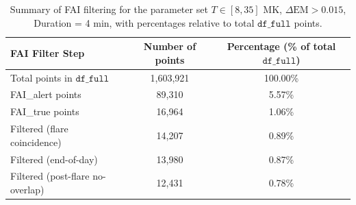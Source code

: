 \begin{table}[h!]
\centering
\caption{{Summary of FAI filtering for the parameter set $T \in [8,35]$ MK, $\Delta\mathrm{EM} > 0.015$, Duration = 4 min, with percentages relative to total $\texttt{{df\_full}}$ points.}}
\begin{tabular}{lcc}
\hline
FAI Filter Step & Number of points & Percentage (\% of total $\texttt{df\_full}$) \\
\hline
Total points in $\texttt{df\_full}$ & 1,603,921 & 100.00\% \\
FAI\_alert points & 89,310 & 5.57\% \\
FAI\_true points & 16,964 & 1.06\% \\
Filtered (flare coincidence) & 14,207 & 0.89\% \\
Filtered (end-of-day) & 13,980 & 0.87\% \\
Filtered (post-flare no-overlap) & 12,431 & 0.78\% \\
\hline
\end{tabular}
\label{tab:fai_filter_T8-35_EM0d015_dur4min}
\end{table}
